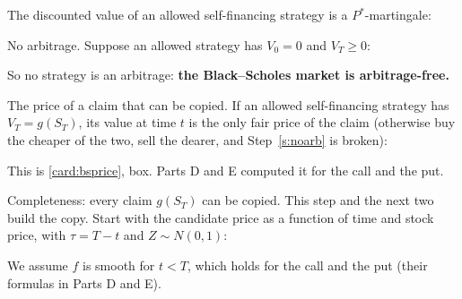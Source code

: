 \begin{steps}[resume]
\item\label{s:vmart} The discounted value of an allowed self-financing strategy is a $P^*$-martingale:
\begin{deriv}
\end{deriv}

\item\label{s:noarb} No arbitrage. Suppose an allowed strategy has $V_0=0$ and $V_T\ge0$:
\begin{deriv}
\end{deriv}
So no strategy is an arbitrage: \textbf{the Black--Scholes market is arbitrage-free.}

\item\label{s:price} The price of a claim that can be copied. If an allowed self-financing strategy has $V_T=g(S_T)$, its value at time $t$ is the only fair price of the claim (otherwise buy the cheaper of the two, sell the dearer, and Step~\ref{s:noarb} is broken):
\begin{deriv}
\end{deriv}
This is \cref{card:bsprice}, box. Parts D and E computed it for the call and the put.

\item\label{s:f} Completeness: every claim $g(S_T)$ can be copied. This step and the next two build the copy. Start with the candidate price as a function of time and stock price, with $\tau=T-t$ and $Z\sim N(0,1)$:
\begin{deriv}
\end{deriv}
We assume $f$ is smooth for $t<T$, which holds for the call and the put (their formulas in Parts D and E).


\end{steps}
